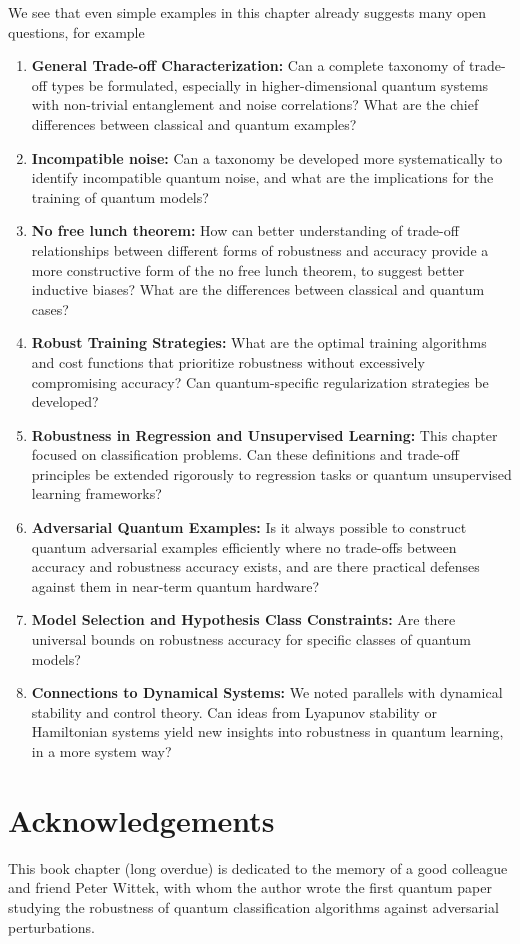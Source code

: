 \documentclass[onecolumn,prx, superscriptaddress,longbibliography,margin=1mm 11pt]{revtex4-2}
\begin{document}
We see that even simple examples in this chapter already suggests many open questions, for example  
\begin{enumerate}
\item	\textbf{General Trade-off Characterization:} Can a complete taxonomy of trade-off types be formulated, especially in higher-dimensional quantum systems with non-trivial entanglement and noise correlations? What are the chief differences between classical and quantum examples? 
\item \textbf{Incompatible noise:} Can a taxonomy be developed more systematically to identify incompatible quantum noise, and what are the implications for the training of quantum models? 
\item \textbf{No free lunch theorem:} How can better understanding of trade-off relationships between different forms of robustness and accuracy provide a more constructive form of the no free lunch theorem, to suggest better inductive biases? What are the differences between classical and quantum cases? 
\item	\textbf{Robust Training Strategies:} What are the optimal training algorithms and cost functions that prioritize robustness without excessively compromising accuracy? Can quantum-specific regularization strategies be developed? 
\item	\textbf{Robustness in Regression and Unsupervised Learning:} This chapter focused on classification problems. Can these definitions and trade-off principles be extended rigorously to regression tasks or quantum unsupervised learning frameworks?
\item	\textbf{Adversarial Quantum Examples:} Is it always possible to construct quantum adversarial examples efficiently where no trade-offs between accuracy and robustness accuracy exists, and are there practical defenses against them in near-term quantum hardware?
\item	\textbf{Model Selection and Hypothesis Class Constraints:} Are there universal bounds on robustness accuracy for specific classes of quantum models?
\item	\textbf{Connections to Dynamical Systems:} We noted parallels with dynamical stability and control theory. Can ideas from Lyapunov stability or Hamiltonian systems yield new insights into robustness in quantum learning, in a more system way?
\end{enumerate}


\section*{Acknowledgements}
This book chapter (long overdue) is dedicated to the memory of a good colleague and friend Peter Wittek, with whom the author wrote the first quantum paper studying the robustness of quantum classification algorithms against adversarial perturbations.  \\
\end{document}
